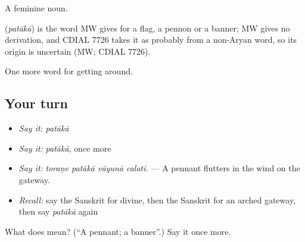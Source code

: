 A feminine noun.

\begin{cousinweb}
\textbf{} (\emph{patākā}) is the word MW gives for a flag, a pennon or a banner; MW gives no derivation, and CDIAL 7726 takes it as probably from a non-Aryan word, so its origin is uncertain (MW; CDIAL 7726).
\end{cousinweb}

\begin{grammarlens}[title={What you've built}]
One more word for getting around.
\end{grammarlens}

\subsection*{Your turn}
\begin{itemize}
\raggedright
  \item \emph{Say it:} \emph{patākā}
  \item \emph{Say it:} \emph{patākā}, once more
  \item \emph{Say it:} \emph{toraṇe patākā vāyunā calati.} — A pennant flutters in the wind on the gateway.
  \item \emph{Recall:} say the Sanskrit for divine, then the Sanskrit for an arched gateway, then say \emph{patākā} again
\end{itemize}

\begin{tcolorbox}[breakable,colback=teal!4,colframe=teal!35!black,title={Before you move on}]
What does  mean? (\textquotedblleft{}A pennant; a banner\textquotedblright{}.) Say it once more.
\end{tcolorbox}
